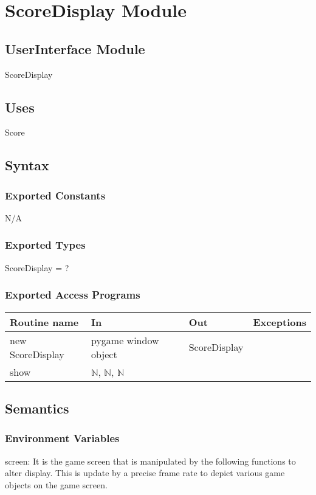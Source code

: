 \documentclass[12pt]{article}
\begin{document}
\newpage
\section{ScoreDisplay Module}

\subsection*{UserInterface Module}
ScoreDisplay
\subsection*{Uses}
Score
\subsection*{Syntax}
\subsubsection*{Exported Constants}
N/A
\subsubsection*{Exported Types}
ScoreDisplay = ?
\subsubsection*{Exported Access Programs}
\begin{tabular}{| l | l | l | l |}
\hline
\textbf{Routine name} & \textbf{In} & \textbf{Out} & \textbf{Exceptions}\\
\hline
new ScoreDisplay       &pygame window object&     ScoreDisplay        &           \\
\hline
show       &	$\mathbb{N}$, $\mathbb{N}$, $\mathbb{N}$     &           &          \\
\hline
\end{tabular}

\subsection*{Semantics}
\subsubsection*{Environment Variables}
screen: It is the game screen that is manipulated by the following functions to alter display. This is update by a precise frame rate to depict various game objects on the game screen.
\end{document}
